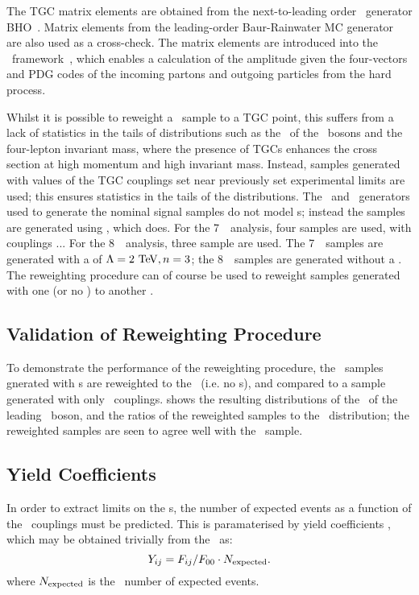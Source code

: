 The TGC matrix elements are obtained from the next-to-leading order \mc\
generator BHO~\cite{bho}. Matrix elements from the leading-order Baur-Rainwater
MC generator~\cite{Baur:1994au} are also used as a cross-check. The matrix
elements are introduced into the \AfterBurner\ framework~\cite{Bella:2008wc},
which enables a calculation of the amplitude given the four-vectors and PDG
codes of the incoming partons and outgoing particles from the hard process. 

Whilst it is possible to reweight a \sm\ sample to a TGC point, this suffers
from a lack of statistics in the tails of distributions such as the \pt\ of the
\Z\ bosons and the four-lepton invariant mass, where the presence of TGCs
enhances the cross section at high momentum and high invariant mass. Instead,
samples generated with values of the TGC couplings set near previously set
experimental limits are used; this ensures statistics in the tails of the
distributions. The \powhegbox\ and \ggZZ\ generators used to generate the nominal signal
samples do not model \TGC s; instead the samples are generated using \sherpa,
which does. For the 7~\tev\ analysis, four samples are used, with couplings
... For the 8~\tev\ analysis, three sample are used. The 7~\tev\ samples are
generated with a \formfactor of $\Lambda=2\tev,n=3$; the 8~\tev\ samples are
generated without a \formfactor. The reweighting procedure can of course be used to
reweight samples generated with one \formfactor (or no \formfactor) to another
\formfactor.

\subsection{Validation of Reweighting Procedure}

To demonstrate the performance of the reweighting procedure, the \sherpa\
samples gnerated with \TGC s are reweighted to the \sm\ (i.e. no \TGC s), and
compared to a sample generated with only \sm\ couplings. \fig{} shows the
resulting distributions of the \pt\ of the leading \Z\ boson, and the ratios of
the reweighted samples to the \sm\ distribution; the reweighted samples are seen
to agree well with the \sm\ sample.

\subsection{Yield Coefficients}

In order to extract limits on the \TGC s, the number of expected events as a
function of the \TGC\ couplings must be predicted. This is paramaterised by
yield coefficients \Yij, which may be obtained trivially from the \Fij\ as:
\begin{equation}
Y_{ij} = F_{ij}/F_{00}\cdot{N_{\rm expected}}.
\end{equation}
where $N_{\rm expected}$ is the \sm\ number of expected events.


